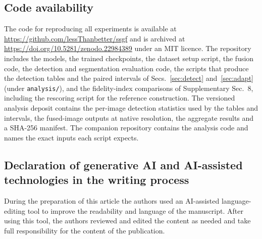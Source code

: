 \documentclass[10pt,a4paper]{article}
\begin{document}
\subsection*{Code availability}
The code for reproducing all experiments is available at
\url{https://github.com/lessThanbetter/ssgf} and is archived at
\url{https://doi.org/10.5281/zenodo.22984389} under an MIT licence. The repository
includes the models,
the trained checkpoints, the dataset setup script, the fusion code, the detection
and segmentation evaluation code, the scripts that produce the detection tables and
the paired intervals of Secs.~\ref{sec:detect} and~\ref{sec:adapt} (under
\texttt{analysis/}), and the fidelity-index comparisons of Supplementary Sec.~8, including
the rescoring script for the reference construction. The versioned analysis deposit
contains the per-image detection statistics used by the tables and intervals, the
fused-image outputs at native resolution, the aggregate results and a SHA-256 manifest.
The companion repository contains the analysis code and names the exact inputs each
script expects.

\subsection*{Declaration of generative AI and AI-assisted technologies in the writing process}
During the preparation of this article the authors used an AI-assisted language-editing
tool to improve the readability and language of the manuscript. After using this tool,
the authors reviewed and edited the content as needed and take full responsibility for
the content of the publication.

\begingroup
\footnotesize

\endgroup
\end{document}
